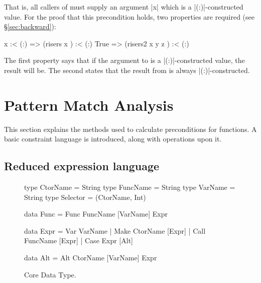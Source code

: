 \noindent That is, all callers of  must supply an argument |x| which is a |(:)|-constructed value. For the proof that this precondition holds, two properties are required (see \S\ref{sec:backward}):

\ignore\begin{code}
x :< (:)  => (risers x       ) :< (:)
True      => (risers2 x y z  ) :< (:)
\end{code}

\noindent The first property says that if the argument to  is a |(:)|-constructed value, the result will be. The second states that the result from  is always |(:)|-constructed.

\section{Pattern Match Analysis}
\label{sec:manipulate}

This section explains the methods used to calculate preconditions for functions. A basic constraint language is introduced, along with operations upon it.

\subsection{Reduced expression language}
\label{sec:core}

\begin{figure}
\begin{code}
type CtorName  =  String
type FuncName  =  String
type VarName   =  String
type Selector  =  (CtorName, Int)

data Func  =  Func FuncName [VarName] Expr

data Expr  =  Var   VarName
           |  Make  CtorName  [Expr]
           |  Call  FuncName  [Expr]
           |  Case  Expr      [Alt]

data Alt   =  Alt CtorName [VarName] Expr
\end{code}
\caption{Core Data Type.}
\label{fig:core}
\figureend
\end{figure}

